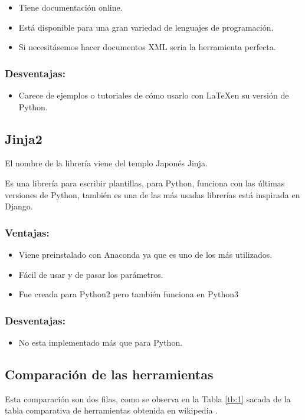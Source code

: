\begin{itemize}
\item Tiene documentación online.
\item Está disponible para una gran variedad de lenguajes de programación.
\item Si necesitásemos hacer documentos XML seria la herramienta perfecta.
\end{itemize}

\subsubsection{Desventajas:}
\begin{itemize}
\item Carece de ejemplos o tutoriales de cómo usarlo con \LaTeX en su versión de Python.
\end{itemize}


\subsection{Jinja2}

El nombre de la librería viene del templo Japonés Jinja.

Es una librería para escribir plantillas, para Python, funciona con las últimas versiones de Python, también es una de las más usadas librerías está inspirada en Django.


\subsubsection{Ventajas:}
\begin{itemize}
\item Viene preinstalado con Anaconda ya que es uno de los más utilizados.
\item Fácil de usar y de pasar los parámetros.
\item Fue creada para Python2 pero también funciona en Python3
\end{itemize}

\subsubsection{Desventajas:}
\begin{itemize}
\item No esta implementado más que para Python.
\end{itemize}

\subsection{Comparación de las herramientas}
Esta comparación son dos filas, como se observa en la Tabla \ref{tb:1} sacada de la tabla comparativa de herramientas obtenida en wikipedia \cite{Template:table}.


